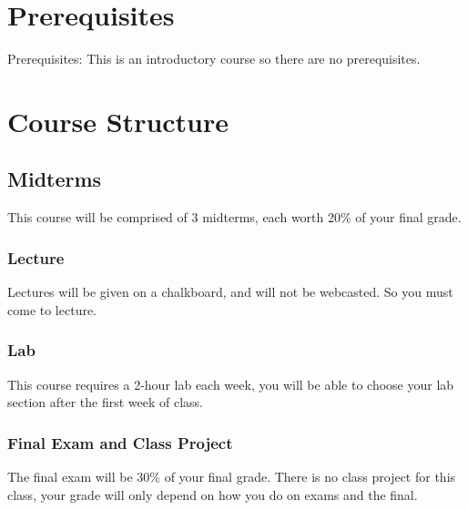 \documentclass[11pt]{article}
\begin{document}

\section*{Prerequisites}
Prerequisites: This is an introductory course so there are no prerequisites.


\section*{Course Structure}

\subsection*{Midterms}

This course will be comprised of 3 midterms, each worth 20\% of your final grade.

\subsubsection*{Lecture}
Lectures will be given on a chalkboard, and will not be webcasted. So you must come to lecture. 

\subsubsection*{Lab}
This course requires a 2-hour lab each week, you will be able to choose your lab section after the first week of class.

\subsubsection*{Final Exam and Class Project}

The final exam will be 30\% of your final grade. There is no class project for this class, your grade will only depend on how you do on exams and the final. 
\end{document}

